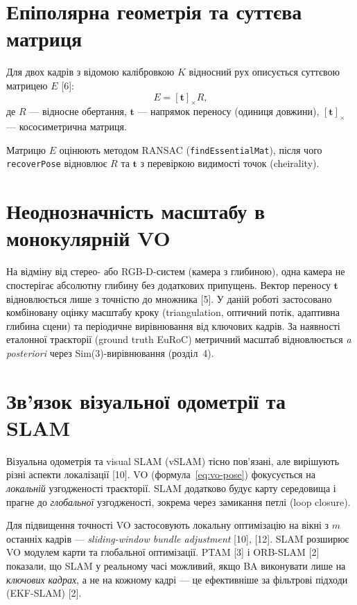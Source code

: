 \documentclass[14pt,a4paper,openany]{extreport}
\begin{document}
\section{Епіполярна геометрія та суттєва матриця}

Для двох кадрів з відомою калібровкою $K$ відносний рух описується суттєвою матрицею $E$ [6]:
\begin{equation}
  E = [\mathbf{t}]_\times R,
  \label{eq:essential}
\end{equation}
\noindent
де $R$ --- відносне обертання, $\mathbf{t}$ --- напрямок переносу (одиниця довжини), $[\mathbf{t}]_\times$ --- кососиметрична матриця.

Матрицю $E$ оцінюють методом RANSAC (\texttt{findEssentialMat}), після чого \texttt{recoverPose} відновлює $R$ та $\mathbf{t}$ з перевіркою видимості точок (cheirality).

\section{Неоднозначність масштабу в монокулярній VO}

На відміну від стерео- або RGB-D-систем (камера з глибиною), одна камера не спостерігає абсолютну глибину без додаткових припущень. Вектор переносу $\mathbf{t}$ відновлюється лише з точністю до множника [5]. У даній роботі застосовано комбіновану оцінку масштабу кроку (triangulation, оптичний потік, адаптивна глибина сцени) та періодичне вирівнювання від ключових кадрів. За наявності еталонної траєкторії (ground truth EuRoC) метричний масштаб відновлюється \emph{a posteriori} через Sim(3)-вирівнювання (розділ~4).

\section{Зв'язок візуальної одометрії та SLAM}

Візуальна одометрія та visual SLAM (vSLAM) тісно пов'язані, але вирішують різні аспекти локалізації [10]. VO (формула~\eqref{eq:vo-pose}) фокусується на \emph{локальній} узгодженості траєкторії. SLAM додатково будує карту середовища і прагне до \emph{глобальної} узгодженості, зокрема через замикання петлі (loop closure).

Для підвищення точності VO застосовують локальну оптимізацію на вікні з $m$ останніх кадрів --- \emph{sliding-window bundle adjustment} [10], [12]. SLAM розширює VO модулем карти та глобальної оптимізації. PTAM [3] і ORB-SLAM [2] показали, що SLAM у реальному часі можливий, якщо BA виконувати лише на \emph{ключових кадрах}, а не на кожному кадрі --- це ефективніше за фільтрові підходи (EKF-SLAM) [2].
\end{document}
